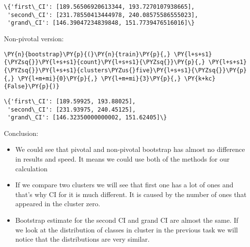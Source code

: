             \begin{tcolorbox}[breakable, size=fbox, boxrule=.5pt, pad at break*=1mm, opacityfill=0]
\begin{Verbatim}[commandchars=\\\{\}]
\{'first\_CI': [189.56506920613344, 193.7270107938665],
 'second\_CI': [231.78550413444978, 240.08575586555023],
 'grand\_CI': [146.39047234839848, 151.7739476516016]\}
\end{Verbatim}
\end{tcolorbox}
        
    Non-pivotal version:

    \begin{tcolorbox}[breakable, size=fbox, boxrule=1pt, pad at break*=1mm,colback=cellbackground, colframe=cellborder]
\begin{Verbatim}[commandchars=\\\{\}]
\PY{n}{bootstrap}\PY{p}{(}\PY{n}{train}\PY{p}{,} \PY{l+s+s1}{\PYZsq{}}\PY{l+s+s1}{count}\PY{l+s+s1}{\PYZsq{}}\PY{p}{,} \PY{l+s+s1}{\PYZsq{}}\PY{l+s+s1}{clusters\PYZus{}five}\PY{l+s+s1}{\PYZsq{}}\PY{p}{,} \PY{l+m+mi}{0}\PY{p}{,} \PY{l+m+mi}{3}\PY{p}{,} \PY{k+kc}{False}\PY{p}{)}
\end{Verbatim}
\end{tcolorbox}

            \begin{tcolorbox}[breakable, size=fbox, boxrule=.5pt, pad at break*=1mm, opacityfill=0]
\begin{Verbatim}[commandchars=\\\{\}]
\{'first\_CI': [189.59925, 193.88025],
 'second\_CI': [231.93975, 240.45125],
 'grand\_CI': [146.32350000000002, 151.62405]\}
\end{Verbatim}
\end{tcolorbox}
        
    Conclusion:

\begin{itemize}
\item
  We could see that pivotal and non-pivotal bootstrap has almost no
  difference in results and speed. It means we could use both of the
  methods for our calculation
\item
  If we compare two clusters we will see that first one has a lot of
  ones and that's why CI for it is much different. It is caused by the
  number of ones that appeared in the cluster zero.
\item
  Bootstrap estimate for the second CI and grand CI are almost the same.
  If we look at the distribution of classes in cluster in\textbar{} the
  previous task we will notice that the distributions are very similar.
\end{itemize}

